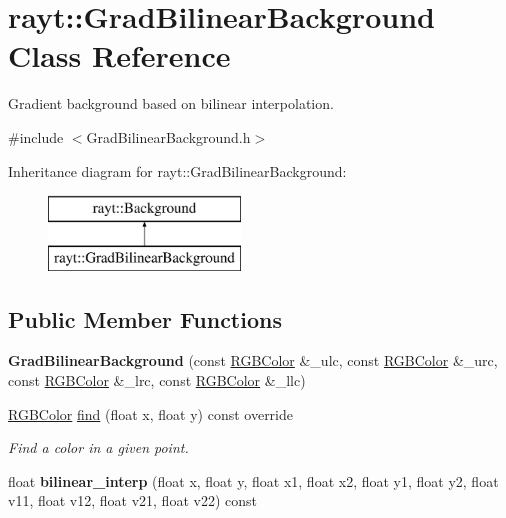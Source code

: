 \hypertarget{classrayt_1_1_grad_bilinear_background}{}\section{rayt\+::Grad\+Bilinear\+Background Class Reference}
\label{classrayt_1_1_grad_bilinear_background}


Gradient background based on bilinear interpolation.  




{\ttfamily \#include $<$Grad\+Bilinear\+Background.\+h$>$}

Inheritance diagram for rayt\+::Grad\+Bilinear\+Background\+:\begin{figure}[H]
\begin{center}
\leavevmode
\includegraphics[height=2.000000cm]{classrayt_1_1_grad_bilinear_background}
\end{center}
\end{figure}
\subsection*{Public Member Functions}
\begin{DoxyCompactItemize}
\item 
\mbox{\label{classrayt_1_1_grad_bilinear_background_a5ab1152bde3de5e7f2a6f82d1487addc}} 
{\bfseries Grad\+Bilinear\+Background} (const \mbox{\hyperlink{classtao_1_1_col}{R\+G\+B\+Color}} \&\+\_\+ulc, const \mbox{\hyperlink{classtao_1_1_col}{R\+G\+B\+Color}} \&\+\_\+urc, const \mbox{\hyperlink{classtao_1_1_col}{R\+G\+B\+Color}} \&\+\_\+lrc, const \mbox{\hyperlink{classtao_1_1_col}{R\+G\+B\+Color}} \&\+\_\+llc)
\item 
\mbox{\hyperlink{classtao_1_1_col}{R\+G\+B\+Color}} \mbox{\hyperlink{classrayt_1_1_grad_bilinear_background_a5619e0167b3ca7a7fb1ab7b9dec1b910}{find}} (float x, float y) const override
\begin{DoxyCompactList}\small\item\em Find a color in a given point. \end{DoxyCompactList}\item 
\mbox{\label{classrayt_1_1_grad_bilinear_background_a5fd61f89857c87a839ab04a513817faf}} 
float {\bfseries bilinear\+\_\+interp} (float x, float y, float x1, float x2, float y1, float y2, float v11, float v12, float v21, float v22) const
\end{DoxyCompactItemize}


